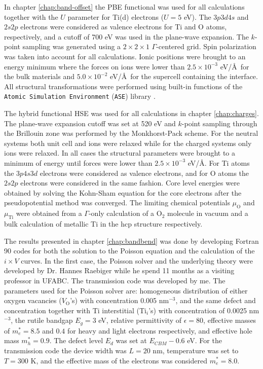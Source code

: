 In chapter \ref{chap:band-offset} the PBE functional \cite{Perdew1997} was used for all calculations together with the $U$ parameter for Ti(d) electrons ($U = 5$ eV). The $3p3d4s$ and $2s2p$ electrons were considered as valence electrons for Ti and O atoms, respectively, and a cutoff of 700 eV was used in the plane-wave expansion. The $k$-point sampling was generated using a $2 \times 2 \times 1$ $\Gamma$-centered grid. Spin polarization was taken into account for all calculations. Ionic positions were brought to an energy minimum where the forces on ions were lower than $2.5 \times 10^{-3}$ eV/\AA \, for the bulk materials and $5.0 \times 10^{-2}$ eV/\AA \, for the supercell containing the interface. All structural transformations were performed using built-in functions of the \texttt{Atomic Simulation Environment} (\texttt{ASE}) library \cite{Bahn2002}.

The hybrid functional HSE was used for all calculations in chapter \ref{chap:charges}. The plane-wave expansion cutoff was set at 520 eV and $k$-point sampling through the Brillouin zone was performed by the Monkhorst-Pack scheme. For the neutral systems both unit cell and ions were relaxed while for the charged systems only ions were relaxed. In all cases the structural parameters were brought to a minimum of energy until forces were lower than $2.5 \times 10^{-3}$ eV/\AA. For Ti atoms the $3p4s3d$ electrons were considered as valence electrons, and for O atoms the $2s2p$ electrons were considered in the same fashion. Core level energies were obtained by solving the Kohn-Sham equation for the core electrons after the pseudopotential method was converged. The limiting chemical potentials $\mu_{\text{O}}$ and $\mu_{\text{Ti}}$ were obtained from a $\Gamma$-only calculation of a O$_2$ molecule in vacuum and a bulk calculation of metallic Ti in the hcp structure respectively.

The results presented in chapter \ref{chap:bandbend} was done by developing Fortran 90 codes for both the solution to the Poisson equation and the calculation of the $i \times V$ curves. In the first case, the Poisson solver and the underlying theory were developed by Dr. Hannes Raebiger while he spend 11 months as a visiting professor in UFABC. The transmission code was developed by me. The parameters used for the Poisson solver are: homogeneous distribution of either oxygen vacancies ($V_{\text{O}}$'s) with concentration 0.005 nm$^{-3}$, and the same defect and concentration together with Ti interstitial (Ti$_{i}$'s) with concentration of 0.0025 nm$^{-3}$, the rutile bandgap $E_g = 3$ eV, relative permittivity of $\epsilon = 80$, effective masses of $m_e^* = 8.5$ and $0.4$ for heavy and light electrons respectively, and effective hole mass $m_h^* = 0.9$. The defect level $E_d$ was set at $E_{CBM} - 0.6$ eV. For the transmission code the device width was $L = 20$ nm, temperature was set to $T = 300$ K, and the effective mass of the electrons was considered $m_e^* = 8.0$.

